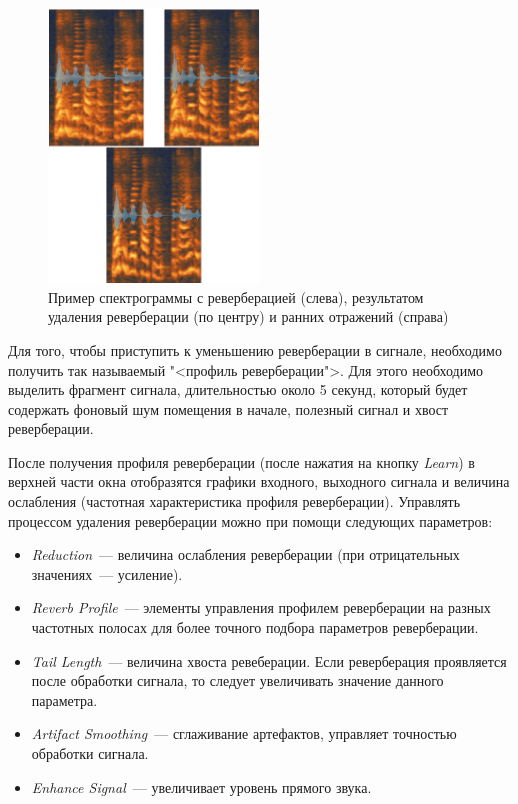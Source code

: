 \documentclass[oneside, final, 14pt]{extreport}
\begin{document}
\begin{figure}[h!]
  \centering
  \includegraphics[width=0.5\textwidth]{pic-rx3dereverb-02}
  \caption{Пример спектрограммы с реверберацией (слева), результатом удаления реверберации (по центру) и ранних отражений (справа)}
  \label{pic-rx3dereverb-02}
\end{figure}

Для того, чтобы приступить к уменьшению реверберации в сигнале, необходимо получить так называемый "<профиль реверберации">. Для этого необходимо выделить фрагмент сигнала, длительностью около 5 секунд, который будет содержать фоновый шум помещения в начале, полезный сигнал и хвост реверберации.

После получения профиля реверберации (после нажатия на кнопку \textit{Learn}) в верхней части окна отобразятся графики входного, выходного сигнала и величина ослабления (частотная характеристика профиля реверберации). Управлять процессом удаления реверберации можно при помощи следующих параметров:
\begin{itemize}
  \item \emph{Reduction}~--- величина ослабления реверберации (при отрицательных значениях~--- усиление).
  \item \emph{Reverb Profile}~--- элементы управления профилем реверберации на разных частотных полосах для более точного подбора параметров реверберации.
  \item \emph{Tail Length}~--- величина хвоста ревеберации. Если реверберация проявляется после обработки сигнала, то следует увеличивать значение данного параметра.
  \item \emph{Artifact Smoothing}~--- сглаживание артефактов, управляет точностью обработки сигнала.
  \item \emph{Enhance Signal}~--- увеличивает уровень прямого звука.
\end{itemize}
\end{document}
